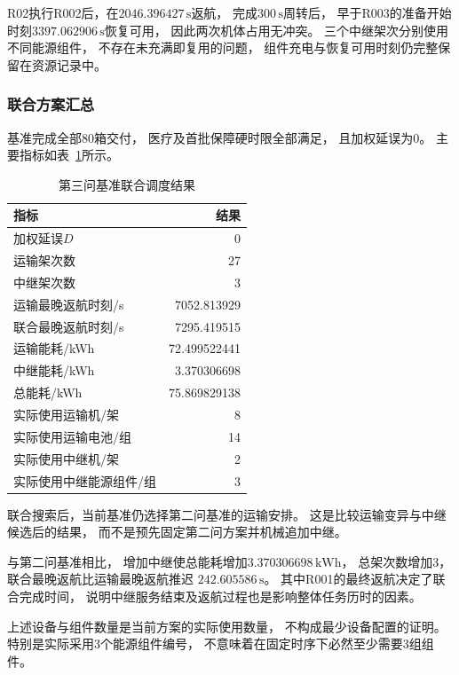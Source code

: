 \documentclass[bwprint]{gmcmthesis}
\begin{document}
R02执行R002后，在$2046.396427\,\mathrm{s}$返航，
完成$300\,\mathrm{s}$周转后，
早于R003的准备开始时刻$3397.062906\,\mathrm{s}$恢复可用，
因此两次机体占用无冲突。
三个中继架次分别使用不同能源组件，
不存在未充满即复用的问题，
组件充电与恢复可用时刻仍完整保留在资源记录中。

\subsubsection{联合方案汇总}

基准完成全部80箱交付，
医疗及首批保障硬时限全部满足，
且加权延误为0。
主要指标如表~\ref{tab:q3_summary}所示。

\begin{table}[htbp]
    \centering
    \caption{第三问基准联合调度结果}
    \label{tab:q3_summary}
    \begin{tabular}{lr}
        \toprule
        指标 & 结果 \\
        \midrule
        加权延误$D$ & 0 \\
        运输架次数 & 27 \\
        中继架次数 & 3 \\
        运输最晚返航时刻/s & 7052.813929 \\
        联合最晚返航时刻/s & 7295.419515 \\
        运输能耗/kWh & 72.499522441 \\
        中继能耗/kWh & 3.370306698 \\
        总能耗/kWh & 75.869829138 \\
        实际使用运输机/架 & 8 \\
        实际使用运输电池/组 & 14 \\
        实际使用中继机/架 & 2 \\
        实际使用中继能源组件/组 & 3 \\
        \bottomrule
    \end{tabular}
\end{table}

联合搜索后，当前基准仍选择第二问基准的运输安排。
这是比较运输变异与中继候选后的结果，
而不是预先固定第二问方案并机械追加中继。

与第二问基准相比，
增加中继使总能耗增加$3.370306698\,\mathrm{kWh}$，
总架次数增加3，
联合最晚返航比运输最晚返航推迟
$242.605586\,\mathrm{s}$。
其中R001的最终返航决定了联合完成时间，
说明中继服务结束及返航过程也是影响整体任务历时的因素。

上述设备与组件数量是当前方案的实际使用数量，
不构成最少设备配置的证明。
特别是实际采用3个能源组件编号，
不意味着在固定时序下必然至少需要3组组件。
\end{document}
